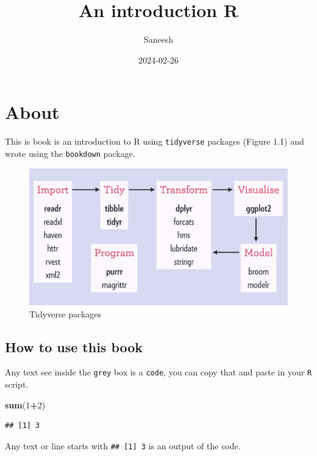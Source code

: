 \documentclass[
]{book}
\title{An introduction R}
\author{Saneesh}
\date{2024-02-26}
\newenvironment{Shaded}{\begin{snugshade}}{\end{snugshade}}
\newcommand{\DecValTok}[1]{\textcolor[rgb]{0.00,0.00,0.81}{#1}}
\newcommand{\FunctionTok}[1]{\textcolor[rgb]{0.13,0.29,0.53}{\textbf{#1}}}
\newcommand{\NormalTok}[1]{#1}
\newcommand{\SpecialCharTok}[1]{\textcolor[rgb]{0.81,0.36,0.00}{\textbf{#1}}}
\begin{document}
\maketitle

{
\hypersetup{linkcolor=}
\setcounter{tocdepth}{1}
\tableofcontents
}
\hypertarget{about}{%
\chapter{About}\label{about}}

This is book is an introduction to R using \texttt{tidyverse} packages (Figure 1.1) and wrote using the \texttt{bookdown} package.

\begin{figure}

{\centering \includegraphics[width=0.7\linewidth]{pictures/tidyverse-overview} 

}

\caption{Tidyverse packages}\label{fig:unnamed-chunk-1}
\end{figure}

\hypertarget{how-to-use-this-book}{%
\section{How to use this book}\label{how-to-use-this-book}}

Any text see inside the \texttt{grey} box is a \texttt{code}, you can copy that and paste in your \texttt{R} script.

\begin{Shaded}
\begin{Highlighting}[]
\FunctionTok{sum}\NormalTok{(}\DecValTok{1}\SpecialCharTok{+}\DecValTok{2}\NormalTok{)}
\end{Highlighting}
\end{Shaded}

\begin{verbatim}
## [1] 3
\end{verbatim}

Any text or line starts with \texttt{\#\#\ {[}1{]}\ 3} is an output of the code.
\end{document}
